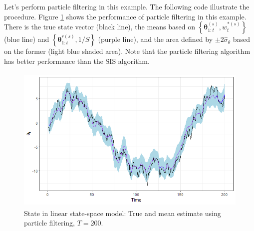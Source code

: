 Let's perform particle filtering in this example. The following code illustrate the procedure. Figure \ref{fig510} shows the performance of particle filtering in this example. There is the true state vector (black line), the means based on $\left\{\bm{\theta}_{1:t}^{(s)},w_t^{*(s)}\right\}$ (blue line) and  $\left\{\bm{\theta}_{1:t}^{r(s)},1/S\right\}$ (purple line), and the area defined by $\pm2\hat{\sigma}_{\theta}$ based on the former (light blue shaded area). Note that the particle filtering algorithm has better performance than the SIS algorithm.   

\begin{figure}[!h]
	\includegraphics[width=340pt, height=200pt]{Chapters/chapter5/figures/PF.png}
	\caption[List of figure caption goes here]{State in linear state-space model: True and mean estimate using particle filtering, $T=200$.}\label{fig510}
\end{figure} 

